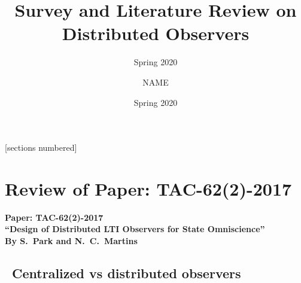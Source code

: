 \documentclass{beamer}
\title{Survey and Literature Review on Distributed Observers}
\subtitle{\small Spring 2020}
\author{NAME}
\institute{@njust.edu.cn}
\date{\scriptsize\color{gray} Spring 2020}
\begin{document}
\begin{frame}
\titlepage
\thispagestyle{empty}
\end{frame}



\begin{frame}
\thispagestyle{empty}

[sections numbered]
\tableofcontents%

\end{frame}





\section{Review of Paper: TAC-62(2)-2017}%

\begin{frame}
\thispagestyle{empty}

\begin{center}
{\large\bf\color{blue}Paper: TAC-62(2)-2017 \\
{\small ``Design of Distributed LTI Observers for State Omniscience''} \\
{\small By S.~Park and N.~C.~Martins}}
\end{center}
\end{frame}



\subsection{~Centralized vs distributed observers}%
\end{document}
